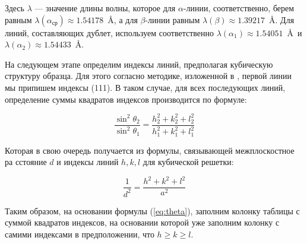 \documentclass[a4paper, 12pt]{article}
\begin{document}
Здесь $\lambda$ --- значение длины волны, которое для $\alpha$-линии, соответственно, берем равным $\lambda(\alpha_\text{ср}) \approx 1.54178$~\AA, а для $\beta$-линии равным $\lambda(\beta) \approx 1.39217$~\AA. Для линий, составляющих дублет, используем соответственно $\lambda(\alpha_1) \approx 1.54051$~\AA~и $\lambda(\alpha_2) \approx 1.54433$~\AA.

На следующем этапе определим индексы линий, предполагая кубическую структуру образца. Для этого согласно методике, изложенной в \cite{Practicum}, первой линии мы припишем индексы (111). В таком случае, для всех последующих линий, определение суммы квадратов индексов производится по формуле:

\begin{equation}
	\frac{\sin^2\theta_2}{\sin^2\theta_1} = \frac{h_2^2 + k_2^2 + l_2^2}{h_1^2 + k_1^2 + l_1^2}
	\label{eq:theta}
\end{equation}

Которая в свою очередь получается из формулы, связывающей межплоскостное ра
сстояние $d$ и индексы линий $h, k, l$ для кубической решетки:

\begin{equation}
	\frac{1}{d^2} = \frac{h^2 + k^2 + l^2}{a^2}
\end{equation}

Таким образом, на основании формулы (\ref{eq:theta}), заполним колонку таблицы с суммой квадратов индексов, на основании которой уже заполним колонку с самими индексами в предположении, что $h \ge k \ge l$.
\end{document}
